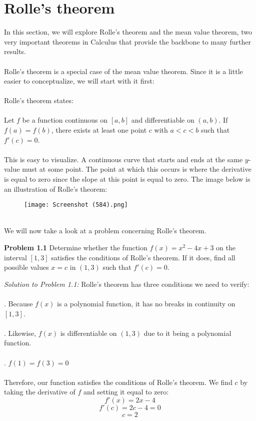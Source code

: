 \documentclass[11pt]{scrartcl}
\begin{document}
\maketitle
\noindent

\section{Rolle's theorem}
\noindent 
In this section, we will explore Rolle's theorem and the mean value theorem, two very important theorems in Calculus that provide the backbone to many further results. \\
\\
\noindent 
Rolle's theorem is a special case of the mean value theorem. Since it is a little easier to conceptualize, we will start with it first: \\
\\
\noindent 
Rolle's theorem states: \\
\\
\noindent 
Let $f$ be a function continuous on $[a,b]$ and differentiable on $(a,b)$. If $f(a)=f(b)$, there exists at least one point $c$ with $a<c<b$ such that $f'(c) = 0$.\\
\\
\noindent 
This is easy to visualize. A continuous curve that starts and ends at the same $y$-value must  at some point. The point at which this occurs is where the derivative is equal to zero since the slope at this point is equal to zero. The image below is an illustration of Rolle's theorem: 
\begin{figure}[htp]
    \centering
    \texttt{[image: Screenshot (584).png]}
\end{figure} \\
\noindent 
We will now take a look at a problem concerning Rolle's theorem. 
\begin{tcolorbox}
[colback=purple!5!white,colframe=purple!75!black]
\textbf{Problem 1.1} Determine whether the function $f(x)=x^2-4x+3$ on the interval $[1,3]$ satisfies the conditions of Rolle's theorem. If it does, find all possible values $x=c$ in $(1,3) $ such that $f'(c)=0$.
\end{tcolorbox}
\noindent 
\textit{Solution to Problem 1.1:} Rolle's theorem has three conditions we need to verify: \\
\\
. Because $f(x)$ is a polynomial function, it has no breaks in continuity on $[1,3]$. \\
\\
. Likewise, $f(x)$ is differentiable on $(1,3)$ due to it being a polynomial function. \\
\\
. $f(1)=f(3)=0$\\
\\
\noindent 
Therefore, our function satisfies the conditions of Rolle's theorem. We find $c$ by taking the derivative of $f$ and setting it equal to zero: 
$$f'(x)=2x-4$$
$$f'(c)=2c-4=0$$
$$c=2$$
\end{document}
